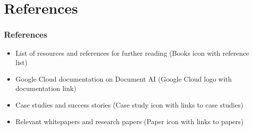 \section{References}

\begin{frame}[fragile]\frametitle{References}
  \begin{itemize}
    \item List of resources and references for further reading (Books icon with reference list)
    \item Google Cloud documentation on Document AI (Google Cloud logo with documentation link)
    \item Case studies and success stories (Case study icon with links to case studies)
    \item Relevant whitepapers and research papers (Paper icon with links to papers)
  \end{itemize}
\end{frame}
